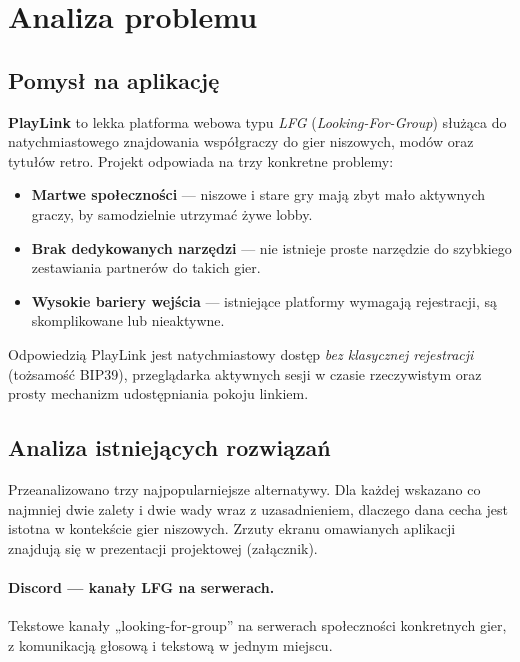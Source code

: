 \section{Analiza problemu}
\label{sec:analiza}

\subsection{Pomysł na aplikację}

\textbf{PlayLink} to lekka platforma webowa typu \emph{LFG} (\textit{Looking-For-Group})
służąca do natychmiastowego znajdowania współgraczy do gier niszowych, modów oraz
tytułów retro. Projekt odpowiada na trzy konkretne problemy:

\begin{itemize}
  \item \textbf{Martwe społeczności} — niszowe i stare gry mają zbyt mało aktywnych
        graczy, by samodzielnie utrzymać żywe lobby.
  \item \textbf{Brak dedykowanych narzędzi} — nie istnieje proste narzędzie do szybkiego
        zestawiania partnerów do takich gier.
  \item \textbf{Wysokie bariery wejścia} — istniejące platformy wymagają rejestracji,
        są skomplikowane lub nieaktywne.
\end{itemize}

Odpowiedzią PlayLink jest natychmiastowy dostęp \emph{bez klasycznej rejestracji}
(tożsamość BIP39), przeglądarka aktywnych sesji w czasie rzeczywistym oraz prosty
mechanizm udostępniania pokoju linkiem.

\subsection{Analiza istniejących rozwiązań}
\label{sec:konkurencja}

Przeanalizowano trzy najpopularniejsze alternatywy. Dla każdej wskazano co najmniej
dwie zalety i dwie wady wraz z uzasadnieniem, dlaczego dana cecha jest istotna w
kontekście gier niszowych. Zrzuty ekranu omawianych aplikacji znajdują się w
prezentacji projektowej (załącznik).

\paragraph{Discord — kanały LFG na serwerach.}
Tekstowe kanały „looking-for-group” na serwerach społeczności konkretnych gier, z
komunikacją głosową i tekstową w jednym miejscu.

